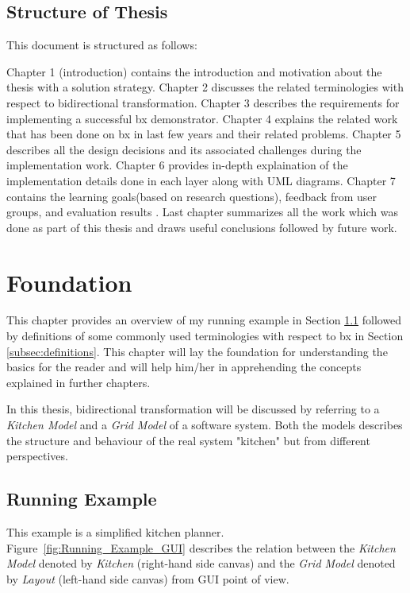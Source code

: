 \subsection{Structure of Thesis}\label{subsec:structure}
This document is structured as follows: 

Chapter 1 (introduction) contains the introduction and motivation about the thesis with a solution strategy. Chapter 2 discusses the related terminologies with respect to bidirectional transformation. Chapter 3 describes the requirements for implementing a successful bx demonstrator. Chapter 4 explains the related work that has been done on bx in last few years and their related problems. Chapter 5 describes all the design decisions and its associated challenges during the implementation work. Chapter 6 provides in-depth explaination of the implementation details done in each layer along with UML diagrams. Chapter 7 contains the learning goals(based on research questions), feedback from user groups, and evaluation results . Last chapter summarizes all the work which was done as part of this thesis and draws useful conclusions followed by future work.

\clearpage
\section{Foundation}\label{sec:foundation}
This chapter provides an overview of my running example in Section \ref{subsec:runningexample} followed by definitions of some commonly used terminologies with respect to bx in Section \ref{subsec:definitions}. This chapter will lay the foundation for understanding the basics for the reader and will help him/her in apprehending the concepts explained in further chapters.

In this thesis, bidirectional transformation will be discussed by referring to a \textit{Kitchen Model} and a \textit{Grid Model} of a software system. Both the models describes the structure and behaviour of the real system "kitchen" but from different perspectives.

\subsection{Running Example}\label{subsec:runningexample}
This example is a simplified kitchen planner. Figure~\ref{fig:Running_Example_GUI} describes the relation between the \textit{Kitchen Model} denoted by \textit{Kitchen} (right-hand side canvas) and the \textit{Grid Model} denoted by \textit{Layout} (left-hand side canvas) from GUI point of view. 

